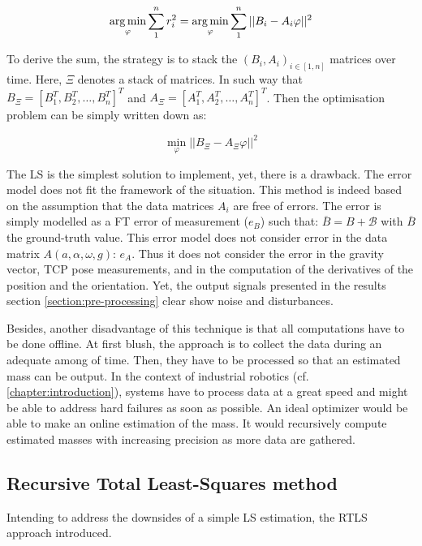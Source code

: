 \documentclass[/home/francois/latex/report/main.tex]{subfiles}
\begin{document}
\begin{equation}
  \operatorname*{arg\,min}_{\varphi} \sum_{1}^{n} r_i^2 = \operatorname*{arg\,min}_{\varphi} \sum_{1}^{n} ||B_i - A_i \varphi||^2
\end{equation}

To derive the sum, the strategy is to stack the $(B_i, A_i)_{i \in [1, n]}$ matrices over time. Here, $\Xi$ denotes a stack of matrices. In such way that $B_\Xi = [B_1^T, B_2^T, \ldots, B_n^T]^T$ and $A_\Xi = [A_1^T, A_2^T, \ldots, A_n^T]^T$. Then the optimisation problem can be simply written down as:

\begin{equation}
  \min_{\varphi} ||B_\Xi - A_\Xi \varphi||^2
\end{equation}

The \ac{LS} is the simplest solution to implement, yet, there is a drawback. The error model does not fit the framework of the situation. This method is indeed based on the assumption that the data matrices $A_i$ are free of errors. The error is simply modelled as a \ac{FT} error of measurement ($e_B$) such that: $\overline{B} = B + \mathcal{B}$ with $\overline{B}$ the ground-truth value. This error model does not consider error in the data matrix $A(a, \alpha, \omega, g)$: $e_A$. Thus it does not consider the error in the gravity vector, \ac{TCP} pose measurements, and in the computation of the derivatives of the position and the orientation. Yet, the output signals presented in the results section \ref{section:pre-processing} clear show noise and disturbances.

Besides, another disadvantage of this technique is that all computations have to be done offline. At first blush, the approach is to collect the data during an adequate among of time. Then, they have to be processed so that an estimated mass can be output. In the context of industrial robotics (cf. \ref{chapter:introduction}), systems have to process data at a great speed and might be able to address hard failures as soon as possible. An ideal optimizer would be able to make an online estimation of the mass. It would recursively compute estimated masses with increasing precision as more data are gathered.

\subsection{Recursive Total Least-Squares method}

Intending to address the downsides of a simple \ac{LS} estimation, the \ac{RTLS} approach introduced.
\end{document}
